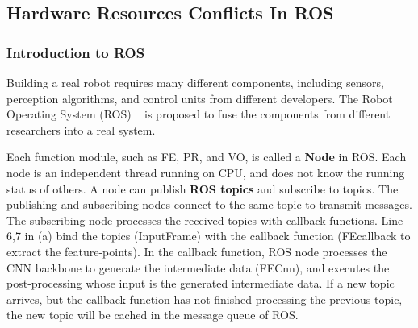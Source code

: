 \subsection{Hardware Resources Conflicts In ROS}
\subsubsection{Introduction to ROS} Building a real robot requires many different components, including sensors, perception algorithms, and control units from different developers. The Robot Operating System (ROS)  ~\cite{quigley2009ros} is proposed to fuse the components from different researchers into a real system.

Each function module, such as FE, PR, and VO, is called a \textbf{Node} in ROS. Each node is an independent thread running on CPU, and does not know the running status of others. 
A node can publish \textbf{ROS topics} and subscribe to topics. The publishing and subscribing nodes connect to the same topic to transmit messages.
The subscribing node processes the received topics with callback functions. Line 6,7 in (a) bind the topics (InputFrame) with the callback function (FEcallback to extract the feature-points). In the callback function, ROS node processes the CNN backbone to generate the intermediate data (FECnn), and executes the post-processing whose input is the generated intermediate data. If a new topic arrives, but the callback function has not finished processing the previous topic, the new topic will be cached in the message queue of ROS.






